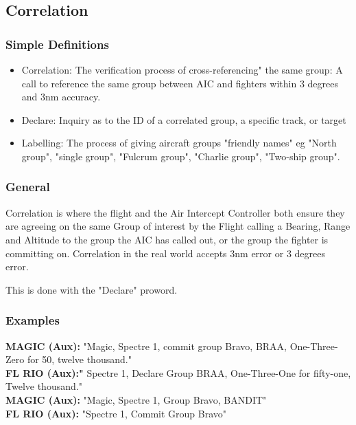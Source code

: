 \subsection{Correlation}

\subsubsection*{Simple Definitions}

\begin{itemize}

  \item Correlation: The verification process of cross-referencing" the same
    group: A call to reference the same group between AIC and fighters
    within 3 degrees and 3nm accuracy.

  \item Declare: Inquiry as to the ID of a correlated group, a specific track,
    or target

  \item Labelling: The process of giving aircraft groups "friendly names" eg
    "North group", "single group", "Fulcrum group", "Charlie group", "Two-ship
    group".

\end{itemize}

\subsubsection*{General}

Correlation is where the flight and the Air Intercept Controller both ensure
they are agreeing on the same Group of interest by the Flight calling a
Bearing, Range and Altitude to the group the AIC has called out, or the group
the fighter is committing on. Correlation in the real world accepts 3nm error
or 3 degrees error.

This is done with the "Declare" proword.


\subsubsection*{Examples}

\textbf{MAGIC (Aux):} "Magic, Spectre 1, commit group Bravo, BRAA,
One-Three-Zero for 50, twelve thousand."
\\
\textbf{FL RIO (Aux):"} Spectre 1, Declare Group BRAA, One-Three-One for
fifty-one, Twelve thousand."
\\
\textbf{MAGIC (Aux):} "Magic, Spectre 1, Group Bravo, BANDIT"
\\
\textbf{FL RIO (Aux):} "Spectre 1, Commit Group Bravo"

